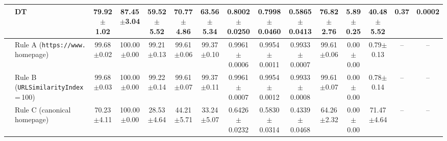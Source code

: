 \begin{tabular}{@{}llccccccccccccc@{}}
 & DT & 79.92{\tiny$\pm$1.02} & 87.45{\tiny$\pm$3.04} & 59.52{\tiny$\pm$5.52} & 70.77{\tiny$\pm$4.86} & 63.56{\tiny$\pm$5.34} & 0.8002{\tiny$\pm$0.0250} & 0.7998{\tiny$\pm$0.0460} & 0.5865{\tiny$\pm$0.0413} & 76.82{\tiny$\pm$2.76} & 5.89{\tiny$\pm$0.25} & 40.48{\tiny$\pm$5.52} & 0.37 & 0.0002\\
\midrule
{} & Rule A (\texttt{https://www.} homepage) & 99.68{\tiny$\pm$0.02} & 100.00{\tiny$\pm$0.00} & 99.21{\tiny$\pm$0.13} & 99.61{\tiny$\pm$0.06} & 99.37{\tiny$\pm$0.10} & 0.9961{\tiny$\pm$0.0006} & 0.9954{\tiny$\pm$0.0011} & 0.9933{\tiny$\pm$0.0007} & 99.61{\tiny$\pm$0.06} & 0.00{\tiny$\pm$0.00} & 0.79{\tiny$\pm$0.13} & -- & --\\
 & Rule B (\texttt{URLSimilarityIndex}\,=\,100) & 99.68{\tiny$\pm$0.03} & 100.00{\tiny$\pm$0.00} & 99.22{\tiny$\pm$0.14} & 99.61{\tiny$\pm$0.07} & 99.37{\tiny$\pm$0.11} & 0.9961{\tiny$\pm$0.0007} & 0.9954{\tiny$\pm$0.0012} & 0.9933{\tiny$\pm$0.0008} & 99.61{\tiny$\pm$0.07} & 0.00{\tiny$\pm$0.00} & 0.78{\tiny$\pm$0.14} & -- & --\\
 & Rule C (canonical homepage) & 70.23{\tiny$\pm$4.11} & 100.00{\tiny$\pm$0.00} & 28.53{\tiny$\pm$4.64} & 44.21{\tiny$\pm$5.71} & 33.24{\tiny$\pm$5.07} & 0.6426{\tiny$\pm$0.0232} & 0.5830{\tiny$\pm$0.0314} & 0.4339{\tiny$\pm$0.0468} & 64.26{\tiny$\pm$2.32} & 0.00{\tiny$\pm$0.00} & 71.47{\tiny$\pm$4.64} & -- & --\\
\bottomrule
\end{tabular}